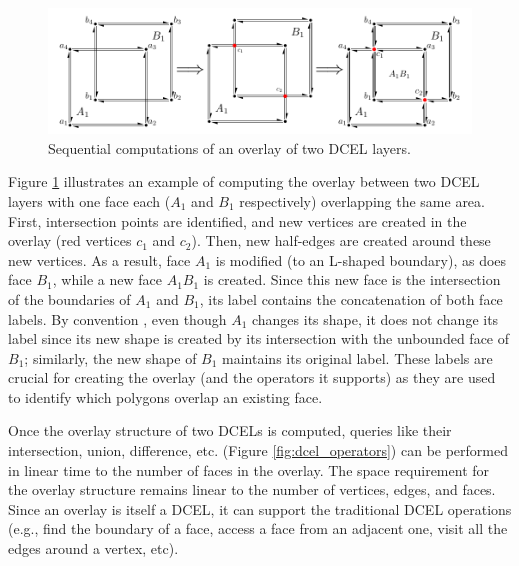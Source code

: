 \begin{figure}
    \centering
    \includegraphics[width=\linewidth]{chapterSDCEL/dcel2}
    \caption{Sequential computations of an overlay of two DCEL layers.}\label{fig:dcel_seq}
\end{figure}

Figure \ref{fig:dcel_seq} illustrates an example of computing the overlay between two DCEL layers with one face each ($A_1$ and $B_1$ respectively) overlapping the same area. First, intersection points are identified, and new vertices are created in the overlay (red vertices $c_1$ and $c_2$). Then, new half-edges are created around these new vertices. As a result, face $A_1$ is modified (to an L-shaped boundary), as does face $B_1$, while a new face $A_1B_1$ is created. Since this new face is the intersection of the boundaries of $A_1$ and $B_1$, its label contains the concatenation of both face labels. By convention \cite{berg_computational_2008}, even though $A_1$ changes its shape, it does not change its label since its new shape is created by its intersection with the unbounded face of $B_1$; similarly, the new shape of $B_1$ maintains its original label. These labels are crucial for creating the overlay (and the operators it supports) as they are used to identify which polygons overlap an existing face.

Once the overlay structure of two DCELs is computed, queries like their intersection, union, difference, etc. (Figure \ref{fig:dcel_operators}) can be performed in linear time to the number of faces in the overlay. The space requirement for the overlay structure remains linear to the number of vertices, edges, and faces. Since an overlay is itself a DCEL, it can support the traditional DCEL operations (e.g., find the boundary of a face, access a face from an adjacent one, visit all the edges around a vertex, etc).

